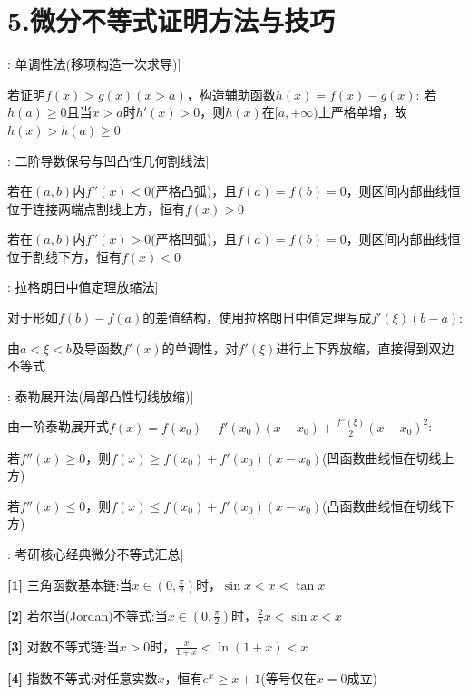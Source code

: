 \documentclass[11pt,a4paper,UTF8]{ctexart}
\begin{document}
\section{5.微分不等式证明方法与技巧}

\begin{thmbox}[原理[1]: 单调性法(移项构造一次求导)]

若证明$f(x) > g(x)(x > a)$，构造辅助函数$h(x) = f(x) - g(x)$:
若$h(a) \ge 0$且当$x > a$时$h'(x) > 0$，则$h(x)$在$[a, +\infty)$上严格单增，故$h(x) > h(a) \ge 0$ 

\end{thmbox}
\begin{thmbox}[原理[2]: 二阶导数保号与凹凸性几何割线法]

若在$(a, b)$内$f''(x) < 0$(严格凸弧)，且$f(a) = f(b) = 0$，则区间内部曲线恒位于连接两端点割线上方，恒有$f(x) > 0$ 

若在$(a, b)$内$f''(x) > 0$(严格凹弧)，且$f(a) = f(b) = 0$，则区间内部曲线恒位于割线下方，恒有$f(x) < 0$ 

\end{thmbox}
\begin{thmbox}[原理[3]: 拉格朗日中值定理放缩法]

对于形如$f(b) - f(a)$的差值结构，使用拉格朗日中值定理写成$f'(\xi)(b - a)$:

由$a < \xi < b$及导函数$f'(x)$的单调性，对$f'(\xi)$进行上下界放缩，直接得到双边不等式 

\end{thmbox}
\begin{thmbox}[原理[4]: 泰勒展开法(局部凸性切线放缩)]

由一阶泰勒展开式$f(x) = f(x_0) + f'(x_0)(x - x_0) + \frac{f''(\xi)}{2}(x - x_0)^2$:

若$f''(x) \ge 0$，则$f(x) \ge f(x_0) + f'(x_0)(x - x_0)$(凹函数曲线恒在切线上方) 

若$f''(x) \le 0$，则$f(x) \le f(x_0) + f'(x_0)(x - x_0)$(凸函数曲线恒在切线下方) 

\end{thmbox}
\begin{thmbox}[原理[5]: 考研核心经典微分不等式汇总]

\textbf{[1]} 三角函数基本链:当$x \in \left(0, \frac{\pi}{2}\right)$时，$\sin x < x < \tan x$

\textbf{[2]} 若尔当(Jordan)不等式:当$x \in \left(0, \frac{\pi}{2}\right)$时，$\frac{2}{\pi}x < \sin x < x$

\textbf{[3]} 对数不等式链:当$x > 0$时，$\frac{x}{1+x} < \ln(1+x) < x$

\textbf{[4]} 指数不等式:对任意实数$x$，恒有$e^x \ge x + 1$(等号仅在$x = 0$成立)
\end{thmbox}
\end{document}
